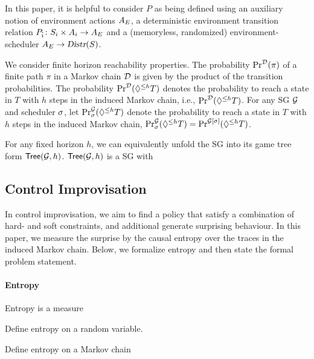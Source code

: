 In this paper, it is helpful to consider $P$ as being defined using an auxiliary notion of environment actions $A_E$, a deterministic environment transition relation $P_{\hat{i}}\colon S_i \times A_i \rightarrow A_E$ and a (memoryless, randomized) environment-scheduler $A_E \rightarrow \textsl{Distr}(S)$.

We consider finite horizon reachability properties.
The probability $\Pr^{\mathcal{D}}(\pi)$ of a finite path $\pi$ in a Markov chain $\mathcal{D}$ is given by the product of the transition probabilities. The probability $\Pr^{\mathcal{D}}(\lozenge^{\leq h} T)$ denotes the probability to reach a state in $T$ with $h$ steps in the induced Markov chain, i.e., $\Pr^{\mathcal{D}}(\lozenge^{\leq h} T)$.
For any SG $\mathcal{G}$ and scheduler $\sigma$, let $\Pr^{\mathcal{G}}_\sigma(\lozenge^{\leq h} T)$ denote the probability to reach a state in $T$ with $h$ steps in the induced Markov chain, $\Pr^{\mathcal{G}}_\sigma(\lozenge^{\leq h} T)= \Pr^{\mathcal{G}[\sigma]}(\lozenge^{\leq h} T)$.  

For any fixed horizon $h$, we can equivalently unfold the SG into its game tree form $\textsf{Tree}(\mathcal{G},h)$. $\textsf{Tree}(\mathcal{G},h)$ is a SG with 


\subsection{Control Improvisation}
In control improvisation, we aim to find a policy that satisfy a combination of hard- and soft constraints, and additional generate surprising behaviour. In this paper, we measure the surprise by the causal entropy over the traces in the induced Markov chain. Below, we formalize entropy and then state the formal problem statement. 
\paragraph{Entropy}
Entropy is a measure 

Define entropy on a random variable.

Define entropy on a Markov chain


